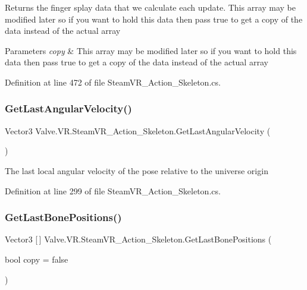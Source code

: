 Returns the finger splay data that we calculate each update. This array may be modified later so if you want to hold this data then pass true to get a copy of the data instead of the actual array 


\begin{DoxyParams}{Parameters}
{\em copy} & This array may be modified later so if you want to hold this data then pass true to get a copy of the data instead of the actual array\\
\hline
\end{DoxyParams}


Definition at line 472 of file Steam\+V\+R\+\_\+\+Action\+\_\+\+Skeleton.\+cs.

\mbox{\label{class_valve_1_1_v_r_1_1_steam_v_r___action___skeleton_a5d0fd95a106853daf5b4969a95427c76}} 
\subsubsection{\texorpdfstring{GetLastAngularVelocity()}{GetLastAngularVelocity()}}
{\footnotesize\ttfamily Vector3 Valve.\+V\+R.\+Steam\+V\+R\+\_\+\+Action\+\_\+\+Skeleton.\+Get\+Last\+Angular\+Velocity (\begin{DoxyParamCaption}{ }\end{DoxyParamCaption})}



The last local angular velocity of the pose relative to the universe origin 



Definition at line 299 of file Steam\+V\+R\+\_\+\+Action\+\_\+\+Skeleton.\+cs.

\mbox{\label{class_valve_1_1_v_r_1_1_steam_v_r___action___skeleton_ae34c92f9b61bc5556917b739bcef0e32}} 
\subsubsection{\texorpdfstring{GetLastBonePositions()}{GetLastBonePositions()}}
{\footnotesize\ttfamily Vector3 \mbox{[}$\,$\mbox{]} Valve.\+V\+R.\+Steam\+V\+R\+\_\+\+Action\+\_\+\+Skeleton.\+Get\+Last\+Bone\+Positions (\begin{DoxyParamCaption}\item[{bool}]{copy = {\ttfamily false} }\end{DoxyParamCaption})}



